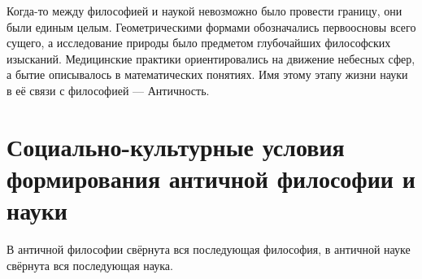 




Когда-то между философией и наукой невозможно было провести границу, они были единым целым. Геометрическими формами обозначались первоосновы всего сущего, а исследование природы было предметом глубочайших философских изысканий. Медицинские практики ориентировались на движение небесных сфер, а бытие описывалось в математических понятиях.  Имя этому этапу жизни науки в её связи с философией — Античность. 

\section{Социально-культурные условия формирования античной философии и науки}


В античной философии свёрнута вся последующая философия, в античной науке свёрнута вся последующая наука. 


